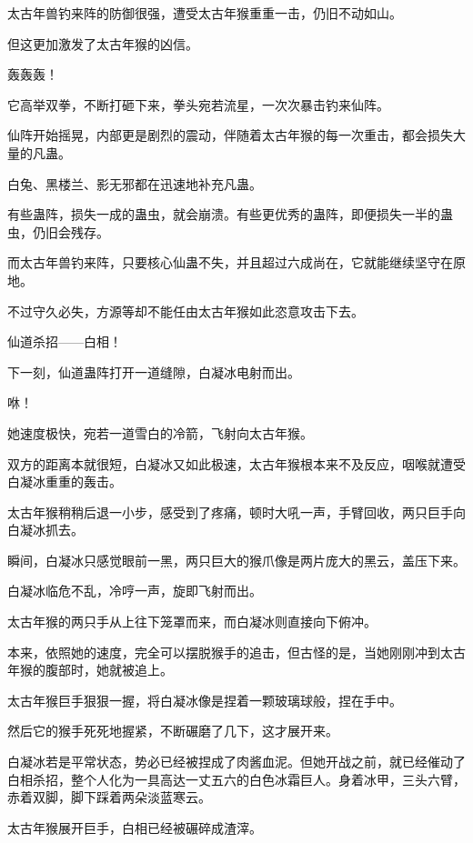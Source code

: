 
\begin{this_body}

太古年兽钓来阵的防御很强，遭受太古年猴重重一击，仍旧不动如山。

但这更加激发了太古年猴的凶信。

轰轰轰！

它高举双拳，不断打砸下来，拳头宛若流星，一次次暴击钓来仙阵。

仙阵开始摇晃，内部更是剧烈的震动，伴随着太古年猴的每一次重击，都会损失大量的凡蛊。

白兔、黑楼兰、影无邪都在迅速地补充凡蛊。

有些蛊阵，损失一成的蛊虫，就会崩溃。有些更优秀的蛊阵，即便损失一半的蛊虫，仍旧会残存。

而太古年兽钓来阵，只要核心仙蛊不失，并且超过六成尚在，它就能继续坚守在原地。

不过守久必失，方源等却不能任由太古年猴如此恣意攻击下去。

仙道杀招——白相！

下一刻，仙道蛊阵打开一道缝隙，白凝冰电射而出。

咻！

她速度极快，宛若一道雪白的冷箭，飞射向太古年猴。

双方的距离本就很短，白凝冰又如此极速，太古年猴根本来不及反应，咽喉就遭受白凝冰重重的轰击。

太古年猴稍稍后退一小步，感受到了疼痛，顿时大吼一声，手臂回收，两只巨手向白凝冰抓去。

瞬间，白凝冰只感觉眼前一黑，两只巨大的猴爪像是两片庞大的黑云，盖压下来。

白凝冰临危不乱，冷哼一声，旋即飞射而出。

太古年猴的两只手从上往下笼罩而来，而白凝冰则直接向下俯冲。

本来，依照她的速度，完全可以摆脱猴手的追击，但古怪的是，当她刚刚冲到太古年猴的腹部时，她就被追上。

太古年猴巨手狠狠一握，将白凝冰像是捏着一颗玻璃球般，捏在手中。

然后它的猴手死死地握紧，不断碾磨了几下，这才展开来。

白凝冰若是平常状态，势必已经被捏成了肉酱血泥。但她开战之前，就已经催动了白相杀招，整个人化为一具高达一丈五六的白色冰霜巨人。身着冰甲，三头六臂，赤着双脚，脚下踩着两朵淡蓝寒云。

太古年猴展开巨手，白相已经被碾碎成渣滓。


\end{this_body}
